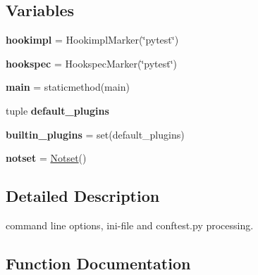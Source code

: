 \subsection*{Variables}
\begin{DoxyCompactItemize}
\item 
\mbox{\label{namespace__pytest_1_1config_a0e9dfb5c105ffa3105c3a76f19d5c9ce}} 
{\bfseries hookimpl} = Hookimpl\+Marker(\char`\"{}pytest\char`\"{})
\item 
\mbox{\label{namespace__pytest_1_1config_a968c519dcb5d8c97d24cda82a02eec85}} 
{\bfseries hookspec} = Hookspec\+Marker(\char`\"{}pytest\char`\"{})
\item 
\mbox{\label{namespace__pytest_1_1config_a7a5dd2bc8c96724804fd340c0a3ec069}} 
{\bfseries main} = staticmethod(main)
\item 
tuple {\bfseries default\+\_\+plugins}
\item 
\mbox{\label{namespace__pytest_1_1config_ad764040c3c5d5d9653f7b3bd585ffc5b}} 
{\bfseries builtin\+\_\+plugins} = set(default\+\_\+plugins)
\item 
\mbox{\label{namespace__pytest_1_1config_af03792b43fdf62b219099dc9bdd6ca3d}} 
{\bfseries notset} = \hyperlink{class__pytest_1_1config_1_1_notset}{Notset}()
\end{DoxyCompactItemize}


\subsection{Detailed Description}
\begin{DoxyVerb}command line options, ini-file and conftest.py processing. \end{DoxyVerb}
 

\subsection{Function Documentation}
\mbox{\label{namespace__pytest_1_1config_a837ae06a76ed429052389abf9d761c53}} 
